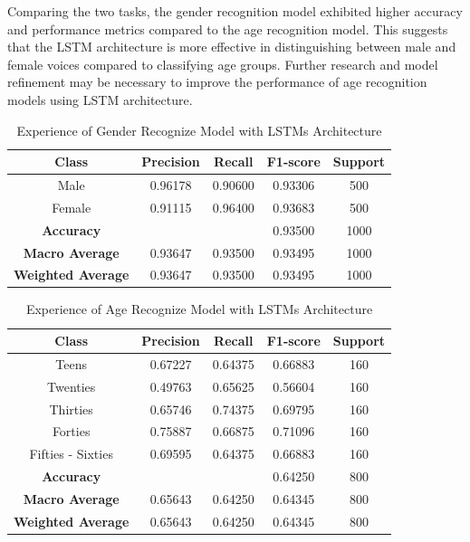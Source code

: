 \documentclass[conference, 10pt,onecolumn]{IEEEtran}
\begin{document}
Comparing the two tasks, the gender recognition model exhibited higher accuracy and performance metrics compared to the age recognition model. This suggests that the LSTM architecture is more effective in distinguishing between male and female voices compared to classifying age groups. Further research and model refinement may be necessary to improve the performance of age recognition models using LSTM architecture.
\begin{table}[htbp]
    \centering
    \begin{tabular}{|c|cccc|}
        \hline
        \textbf{Class} & \textbf{Precision} & \textbf{Recall} & \textbf{F1-score} & \textbf{Support} \\
        \hline
        Male & 0.96178 & 0.90600 & 0.93306 & 500 \\
        Female & 0.91115 & 0.96400 & 0.93683 & 500 \\
        \hline
        \textbf{Accuracy} & \multicolumn{2}{c}{} & 0.93500 & 1000 \\
        \textbf{Macro Average} & 0.93647 & 0.93500 & 0.93495 & 1000 \\
        \textbf{Weighted Average} & 0.93647 & 0.93500 & 0.93495 & 1000 \\
        \hline
    \end{tabular}
    \caption{Experience of Gender Recognize Model with LSTMs Architecture}
    \label{tab:Experience of Gender Recognize Model with LSTM Architecture}
\end{table}

\begin{table}[htbp]
    \centering
    \begin{tabular}{|c|cccc|}
        \hline
        \textbf{Class} & \textbf{Precision} & \textbf{Recall} & \textbf{F1-score} & \textbf{Support} \\
        \hline
        Teens & 0.67227 & 0.64375 & 0.66883 & 160 \\
        Twenties & 0.49763 & 0.65625 & 0.56604 & 160 \\
        Thirties & 0.65746 & 0.74375 & 0.69795 & 160 \\
        Forties & 0.75887 & 0.66875 & 0.71096 & 160 \\
        Fifties - Sixties& 0.69595 & 0.64375 & 0.66883 & 160 \\
        \hline
        \textbf{Accuracy} &  && 0.64250 & 800 \\
        \textbf{Macro Average} & 0.65643 & 0.64250 & 0.64345 & 800 \\
        \textbf{Weighted Average} & 0.65643 & 0.64250 & 0.64345  & 800 \\
        \hline
    \end{tabular}
    \caption{Experience of Age Recognize Model with LSTMs Architecture}
    \label{tab:Experience of Age Recognize Model with LSTMs Architecture}
\end{table}
\end{document}
